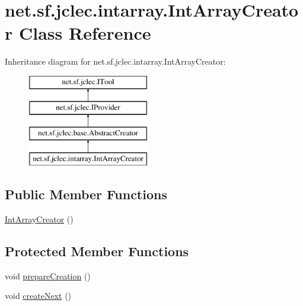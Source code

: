 \hypertarget{classnet_1_1sf_1_1jclec_1_1intarray_1_1_int_array_creator}{\section{net.\-sf.\-jclec.\-intarray.\-Int\-Array\-Creator Class Reference}
\label{classnet_1_1sf_1_1jclec_1_1intarray_1_1_int_array_creator}
}
Inheritance diagram for net.\-sf.\-jclec.\-intarray.\-Int\-Array\-Creator\-:\begin{figure}[H]
\begin{center}
\leavevmode
\includegraphics[height=4.000000cm]{classnet_1_1sf_1_1jclec_1_1intarray_1_1_int_array_creator}
\end{center}
\end{figure}
\subsection*{Public Member Functions}
\begin{DoxyCompactItemize}
\item 
\hyperlink{classnet_1_1sf_1_1jclec_1_1intarray_1_1_int_array_creator_a756f3542cf92a30f3bd630a026bd853d}{Int\-Array\-Creator} ()
\end{DoxyCompactItemize}
\subsection*{Protected Member Functions}
\begin{DoxyCompactItemize}
\item 
void \hyperlink{classnet_1_1sf_1_1jclec_1_1intarray_1_1_int_array_creator_a84dde310784a8ef9935e82195b963136}{prepare\-Creation} ()
\item 
void \hyperlink{classnet_1_1sf_1_1jclec_1_1intarray_1_1_int_array_creator_a099e0903120e3f6ed37eacaf79be97ca}{create\-Next} ()
\end{DoxyCompactItemize}
